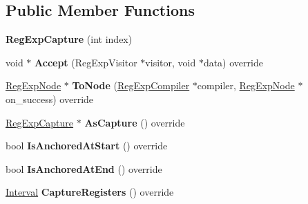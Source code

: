 \subsection*{Public Member Functions}
\begin{DoxyCompactItemize}
\item 
{\bfseries Reg\+Exp\+Capture} (int index)\hypertarget{classv8_1_1internal_1_1_reg_exp_capture_afb97ab193d05e2df6fb2459415c1d29d}{}\label{classv8_1_1internal_1_1_reg_exp_capture_afb97ab193d05e2df6fb2459415c1d29d}

\item 
void $\ast$ {\bfseries Accept} (Reg\+Exp\+Visitor $\ast$visitor, void $\ast$data) override\hypertarget{classv8_1_1internal_1_1_reg_exp_capture_aa61fd0faa9e8f640d53395458dc7d7e0}{}\label{classv8_1_1internal_1_1_reg_exp_capture_aa61fd0faa9e8f640d53395458dc7d7e0}

\item 
\hyperlink{classv8_1_1internal_1_1_reg_exp_node}{Reg\+Exp\+Node} $\ast$ {\bfseries To\+Node} (\hyperlink{classv8_1_1internal_1_1_reg_exp_compiler}{Reg\+Exp\+Compiler} $\ast$compiler, \hyperlink{classv8_1_1internal_1_1_reg_exp_node}{Reg\+Exp\+Node} $\ast$on\+\_\+success) override\hypertarget{classv8_1_1internal_1_1_reg_exp_capture_a26a9a394c68c2e2fe719aaef018323ff}{}\label{classv8_1_1internal_1_1_reg_exp_capture_a26a9a394c68c2e2fe719aaef018323ff}

\item 
\hyperlink{classv8_1_1internal_1_1_reg_exp_capture}{Reg\+Exp\+Capture} $\ast$ {\bfseries As\+Capture} () override\hypertarget{classv8_1_1internal_1_1_reg_exp_capture_aee644c2539caab9a272cb327f27bfa42}{}\label{classv8_1_1internal_1_1_reg_exp_capture_aee644c2539caab9a272cb327f27bfa42}

\item 
bool {\bfseries Is\+Anchored\+At\+Start} () override\hypertarget{classv8_1_1internal_1_1_reg_exp_capture_a54e106635865b5c37ba9cfda2b737b6b}{}\label{classv8_1_1internal_1_1_reg_exp_capture_a54e106635865b5c37ba9cfda2b737b6b}

\item 
bool {\bfseries Is\+Anchored\+At\+End} () override\hypertarget{classv8_1_1internal_1_1_reg_exp_capture_ab4ed4aeff92a5deda7411f9eb224a001}{}\label{classv8_1_1internal_1_1_reg_exp_capture_ab4ed4aeff92a5deda7411f9eb224a001}

\item 
\hyperlink{classv8_1_1internal_1_1_interval}{Interval} {\bfseries Capture\+Registers} () override\hypertarget{classv8_1_1internal_1_1_reg_exp_capture_a7a410515528b3dd6d5ce4140712fca2c}{}\label{classv8_1_1internal_1_1_reg_exp_capture_a7a410515528b3dd6d5ce4140712fca2c}


\end{DoxyCompactItemize}
